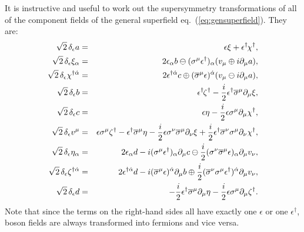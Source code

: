 \documentclass[11pt]{article}
\def\BDplus{+}
\def\BDminus{-}
\def\BDplus{-}
\def\BDminus{+}
\def\BDplus{\oplus}
\def\BDminus{\ominus}
\def\BDplus{\ominus}
\def\BDminus{\oplus}
\def\beq{\begin{eqnarray}}
\def\eeq{\end{eqnarray}}
\def\sigmabar{\overline\sigma}
\begin{document}
It is instructive and useful to work out the supersymmetry 
transformations of all of the component fields of the general superfield 
eq.~(\ref{eq:gensuperfield}). They are:
\beq
\sqrt{2}\,
\delta_\epsilon a &=& \epsilon \xi 
+ \epsilon^\dagger\hspace{-1pt}\chi^\dagger ,
\label{eq:gensuperfieldtransa}
\\
\sqrt{2}\,
\delta_\epsilon \xi_{\alpha} &=& 2 \epsilon_\alpha b 
  \BDplus (\sigma^\mu \epsilon^\dagger)_\alpha (v_\mu \BDminus i \partial_\mu a)
,
\\
\sqrt{2}\,
\delta_\epsilon \chi^{\dagger{\dot\alpha}} &=& 
  2 \epsilon^{\dagger{\dot\alpha}} c 
  \BDminus (\sigmabar^\mu \epsilon)^{\dot \alpha} (v_\mu \BDplus i \partial_\mu a)
,
\\
\sqrt{2}\,
\delta_\epsilon b &=& \epsilon^\dagger\hspace{-1pt} \zeta^\dagger 
- \frac{i}{2} \epsilon^\dagger 
\sigmabar^\mu \partial_\mu \xi
,
\\
\sqrt{2}\,
\delta_\epsilon c &=& \epsilon \eta - \frac{i}{2} \epsilon 
\sigma^\mu \partial_\mu \chi^\dagger
,
\\
\sqrt{2}\,
\delta_\epsilon v^\mu &=& 
\epsilon \sigma^\mu \zeta^\dagger 
-\epsilon^\dagger \sigmabar^\mu \eta
-\frac{i}{2} \epsilon \sigma^\nu \sigmabar^\mu \partial_\nu \xi
+\frac{i}{2} \epsilon^\dagger \sigmabar^\nu \sigma^\mu \partial_\nu \chi^\dagger
,
\\
\sqrt{2}\,
\delta_\epsilon \eta_{\alpha} &=& 2 \epsilon_\alpha d 
- i (\sigma^\mu \epsilon^\dagger)_\alpha \partial_\mu c 
\BDplus \frac{i}{2} (\sigma^\nu \sigmabar^\mu \epsilon)_\alpha \partial_\mu v_\nu
,
\\
\sqrt{2}\,
\delta_\epsilon \zeta^{\dagger{\dot\alpha}} &=& 
2 \epsilon^{\dagger{\dot \alpha}} d 
- i (\sigmabar^\mu \epsilon)^{\dot\alpha} \partial_\mu b 
\BDminus \frac{i}{2} (\sigmabar^\nu \sigma^\mu \epsilon^\dagger )^{\dot \alpha} 
\partial_\mu v_\nu 
,
\\
\sqrt{2}\,
\delta_\epsilon d &=& 
-\frac{i}{2}
\epsilon^\dagger \sigmabar^\mu \partial_\mu \eta
-\frac{i}{2}
\epsilon \sigma^\mu \partial_\mu \zeta^\dagger .
\label{eq:gensuperfieldtransd}
\eeq
Note that since the terms on the right-hand sides all have exactly one $\epsilon$
or one $\epsilon^\dagger$, 
boson fields are always transformed into fermions and vice versa.
\end{document}
